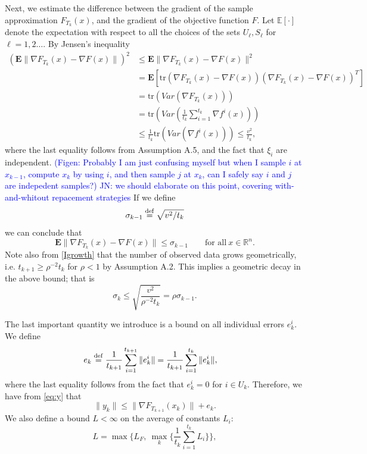 \documentclass[11pt]{article}
\newcommand{\defeq}{\stackrel{\rm def}{=}}
\newcommand{\E}{\mathbf{E}}
\begin{document}
Next, we estimate the difference between the gradient of the sample approximation $F_{T_k}(x)$, and the  gradient of the objective function $F$.  Let $\mathbb{E} [\cdot]$ denote the expectation with respect to all the choices of the sets $U_\ell, S_\ell$ for $\ell=1, 2 \ldots$.
By Jensen's inequality
\begin{align*}
 (\E \|\nabla F_{T_k}(x) - \nabla F(x)\|)^2 & \leq \E \|\nabla F_{T_k}(x) - \nabla F(x)\|^2 \\
  & = \E[\mbox{tr}(\nabla F_{T_k}(x) - \nabla F(x))(\nabla F_{T_k}(x) - \nabla F(x))^T]\\
  & = \mbox{tr}(Var(\nabla F_{T_k}(x)))  \\
  & = \mbox{tr}(Var(\frac{1}{t_{k}}\sum_{i=1}^{t_k} \nabla f^i(x))) \\
  & \leq \frac{1}{t_k}\mbox{tr}(Var(\nabla f^i(x)))   \leq \frac{v^2}{t_k} ,
\end{align*}
where the last equality follows from Assumption A.5, and the fact that $\xi_i$ are independent.
\textcolor{blue}{(Figen: Probably I am just confusing myself but when I sample $i$ at $x_{k-1}$, compute $x_k$ by using $i$, and then sample $j$ at $x_k$, can I safely say $i$ and $j$ are indepedent samples?) JN: we should elaborate on this point, covering with-and-whitout repacement strategies}
If we define
\begin{equation}   \label{sigmad}
 \sigma_{k-1} \defeq \sqrt{{v^2}/{t_k}}
 \end{equation}
 we can conclude that
\begin{equation}\label{eq:var}
 \E \|\nabla F_{T_k}(x) - \nabla F(x)\| \leq \sigma_{k-1} \qquad\mbox{for all} \ x \in \mathbb{R}^n.
\end{equation}
Note also from \eqref{Igrowth} that the number of observed data grows geometrically,  i.e. $t_{k+1} \geq \rho^{-2}t_k$ for $\rho<1$ by Assumption A.2.  This implies a geometric decay in the above bound; that is
\begin{equation}\label{eq:sigma}
 \sigma_k \leq \sqrt{\frac{v^2}{\rho^{-2}t_k}} = \rho \sigma_{k-1}.
\end{equation}


The last important quantity we introduce is a bound on all individual errors $e_k^i$.   We define 
\begin{align}
 e_k &\defeq \frac{1}{t_{k+1}} \sum_{i=1}^{t_{k+1}} \|e_k^i\| = \frac{1}{t_{k+1}}\sum_{i=1}^{t_k}\|e_k^i\|\label{eq:defe},
\end{align}
where the last equality follows from the fact that $e_k^i =0$ for $i \in U_k$. Therefore, we have from \eqref{eq:y} that
\begin{equation} \label{yfe}
    \| y_k \| \leq \| \nabla F_{T_{k+1}}(x_k) \| + e_k.
\end{equation}  
We also define a bound $L<\infty$ on the average of constants $L_i$:
 \begin{equation}\label{eq:L}
  L = \max \{L_F, \ \max_k \{\frac{1}{t_{k}}\sum_{i=1}^{t_k}L_i\}\},
 \end{equation}
 
\end{document}
